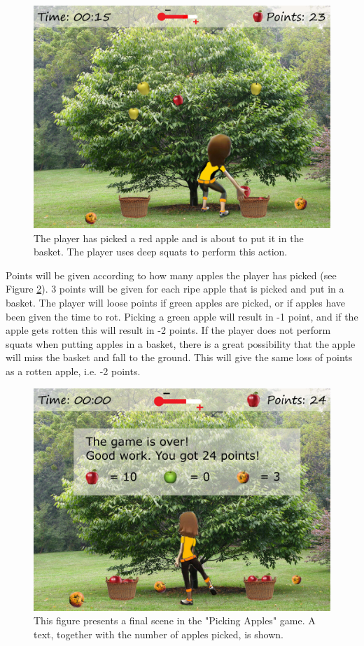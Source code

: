\begin{figure} [H]
\centering
\includegraphics[scale=0.07]{squatppletreeEng.jpg}
\caption[Picking apples - squats]{The player has picked a red apple and is about to put it in the basket. The player uses deep squats to perform this action.}
\label{fig:appleSquat}
\end{figure}

Points will be given according to how many apples the player has picked (see Figure \ref{fig:appleOver}). 3 points will be given for each ripe apple that is picked and put in a basket. The player will loose points if green apples are picked, or if apples have been given the time to rot. Picking a green apple will result in -1 point, and if the apple gets rotten this will result in -2 points. If the player does not perform squats when putting apples in a basket, there is a great possibility that the apple will miss the basket and fall to the ground. This will give the same loss of points as a rotten apple, i.e. -2 points.       

\begin{figure} [H]
\centering
\includegraphics[scale=0.07]{appletreeendEng.jpg}
\caption[Picking apples - points]{This figure presents a final scene in the "Picking Apples" game. A text, together with the number of apples picked, is shown.}
\label{fig:appleOver}
\end{figure}

